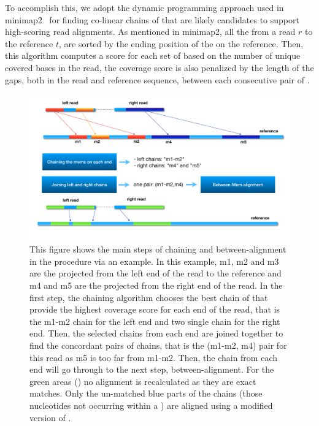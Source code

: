 To accomplish this, we adopt the dynamic programming approach used in
minimap2~\citep{minimap2} for finding co-linear chains of \mems that
are likely candidates to support high-scoring read alignments. As
mentioned in minimap2, all the \mems from a read $r$ to the reference
$t$, are sorted by the ending position of the \mems on the reference.
Then, this algorithm computes a score for each set of \mems
based on the number of unique covered bases in the read, the coverage
score is also penalized by the length of the gaps, both in the read
and reference sequence, between each consecutive pair of \mems.

\begin{figure}%
    \centering
    \includegraphics[width=0.95\columnwidth, trim={0in 0in 0in 0in},clip]{Figures/puff/MainFig.pdf}
    \caption[Main steps of chaining and between-\mem alignment in the \puffaligner]
    {This figure shows the main steps of chaining and
    between-\mem alignment in the \puffaligner procedure via an
    example. In this example, m1, m2 and m3 are the projected \mems
    from the left end of the read to the reference and m4 and m5 are
    the projected \mems from the right end of the read. In the first
    step, the chaining algorithm chooses the best chain of \mems that
    provide the highest coverage score for each end of the read, that
    is the m1-m2 chain for the left end and two single \mem chain for
    the right end. Then, the selected chains from each end are joined
    together to find the concordant pairs of chains, that is the
    (m1-m2, m4) pair for this read as m5 is too far from m1-m2. Then,
    the chain from each end will go through to the next step,
    between-\mem alignment. For the green areas (\mems) no alignment
    is recalculated as they are exact matches. Only the un-matched
    blue parts of the chains (those nucleotides not occurring within
    a \mem) are aligned using a modified version of \ksw. }
    \label{fig:mainScheme}
\end{figure}

